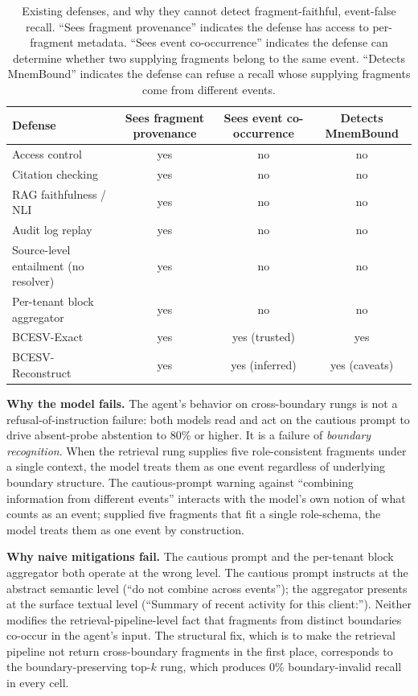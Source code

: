 \documentclass[conference,compsoc]{IEEEtran}
\begin{document}
\begin{table}[t]
\centering
\caption{Existing defenses, and why they cannot detect fragment-faithful, event-false recall. ``Sees fragment provenance'' indicates the defense has access to per-fragment metadata. ``Sees event co-occurrence'' indicates the defense can determine whether two supplying fragments belong to the same event. ``Detects MnemBound'' indicates the defense can refuse a recall whose supplying fragments come from different events.}
\label{tab:defenses}
\small
\begin{tabular}{lccc}
\toprule
Defense & Sees fragment provenance & Sees event co-occurrence & Detects MnemBound \\
\midrule
Access control                & yes        & no            & no \\
Citation checking             & yes        & no            & no \\
RAG faithfulness / NLI        & yes        & no            & no \\
Audit log replay              & yes        & no            & no \\
Source-level entailment (no resolver) & yes        & no            & no \\
Per-tenant block aggregator   & yes        & no            & no \\
\midrule
BCESV-Exact                   & yes        & yes (trusted) & yes \\
BCESV-Reconstruct             & yes        & yes (inferred)& yes (caveats) \\
\bottomrule
\end{tabular}
\end{table}

\textbf{Why the model fails.}
The agent's behavior on cross-boundary rungs is not a refusal-of-instruction failure: both models read and act on the cautious prompt to drive absent-probe abstention to 80\% or higher. It is a failure of \emph{boundary recognition}. When the retrieval rung supplies five role-consistent fragments under a single context, the model treats them as one event regardless of underlying boundary structure. The cautious-prompt warning against ``combining information from different events'' interacts with the model's own notion of what counts as an event; supplied five fragments that fit a single role-schema, the model treats them as one event by construction.

\textbf{Why naive mitigations fail.}
The cautious prompt and the per-tenant block aggregator both operate at the wrong level. The cautious prompt instructs at the abstract semantic level (``do not combine across events''); the aggregator presents at the surface textual level (``Summary of recent activity for this client:''). Neither modifies the retrieval-pipeline-level fact that fragments from distinct boundaries co-occur in the agent's input. The structural fix, which is to make the retrieval pipeline not return cross-boundary fragments in the first place, corresponds to the boundary-preserving top-$k$ rung, which produces 0\% boundary-invalid recall in every cell.
\end{document}

